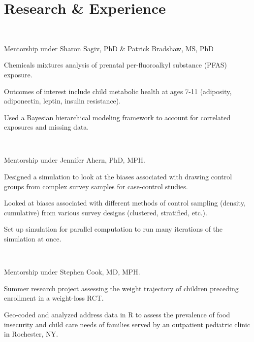 
\section{Research \& Experience}

\\
\begin{tightemize}
\item Mentorship under Sharon Sagiv, PhD \& Patrick Bradshaw, MS, PhD
\item Chemicals mixtures analysis of prenatal per-fluoroalkyl substance (PFAS) exposure.
\item Outcomes of interest include child metabolic health at ages 7-11 (adiposity, adiponectin, leptin, insulin resistance).
\item Used a Bayesian hierarchical modeling framework to account for correlated exposures and missing data.
\end{tightemize}
\sectionsep

\\
\begin{tightemize}
\item Mentorship under Jennifer Ahern, PhD, MPH.
\item Designed a simulation to look at the biases associated with drawing control groups from complex survey samples for case-control studies.
\item Looked at biases associated with different methods of control sampling (density, cumulative) from various survey designs (clustered, stratified, etc.).
\item Set up simulation for parallel computation to run many iterations of the simulation at once.
\end{tightemize}
\sectionsep

\\
\begin{tightemize}
\item Mentorship under Stephen Cook, MD, MPH.
\item Summer research project assessing the weight trajectory of children preceding enrollment in a weight-loss RCT.
\item Geo-coded and analyzed address data in R to assess the prevalence of food insecurity and child care needs of families served by an outpatient pediatric clinic in Rochester, NY.
\end{tightemize}
\sectionsep

